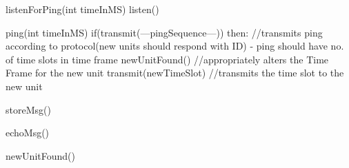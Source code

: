 listenForPing(int timeInMS)
    listen()

ping(int timeInMS)
    if(transmit(---pingSequence---)) then:                              //transmits ping according to protocol(new units should respond with ID) - ping should have no. of time slots in time frame
        newUnitFound()                                                  //appropriately alters the Time Frame for the new unit
        transmit(newTimeSlot)                                           //transmits the time slot to the new unit

storeMsg()

echoMsg()

newUnitFound()